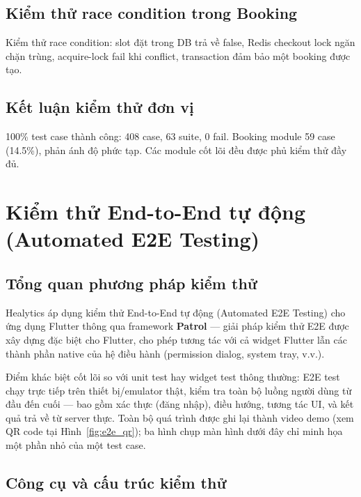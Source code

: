 \subsection{Kiểm thử race condition trong Booking}

Kiểm thử race condition: slot đặt trong DB trả về false, Redis checkout lock ngăn chặn trùng, acquire-lock fail khi conflict, transaction đảm bảo một booking được tạo.

\subsection{Kết luận kiểm thử đơn vị}

100\% test case thành công: 408 case, 63 suite, 0 fail. Booking module 59 case (14.5\%), phản ánh độ phức tạp. Các module cốt lõi đều được phủ kiểm thử đầy đủ.

\section{Kiểm thử End-to-End tự động (Automated E2E Testing)}

\subsection{Tổng quan phương pháp kiểm thử}

Healytics áp dụng kiểm thử End-to-End tự động (Automated E2E Testing) cho ứng dụng Flutter thông qua framework \textbf{Patrol} --- giải pháp kiểm thử E2E được xây dựng đặc biệt cho Flutter, cho phép tương tác với cả widget Flutter lẫn các thành phần native của hệ điều hành (permission dialog, system tray, v.v.).

Điểm khác biệt cốt lõi so với unit test hay widget test thông thường: E2E test chạy trực tiếp trên thiết bị/emulator thật, kiểm tra toàn bộ luồng người dùng từ đầu đến cuối --- bao gồm xác thực (đăng nhập), điều hướng, tương tác UI, và kết quả trả về từ server thực. Toàn bộ quá trình được ghi lại thành video demo (xem QR code tại Hình~\ref{fig:e2e_qr}); ba hình chụp màn hình dưới đây chỉ minh họa một phần nhỏ của một test case.

\subsection{Công cụ và cấu trúc kiểm thử}

